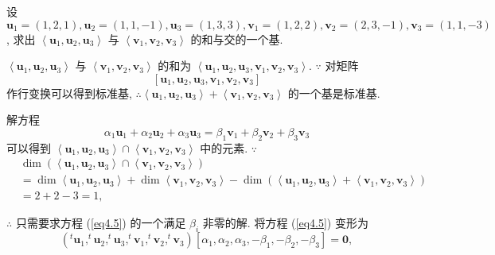 \documentclass[color=black,device=normal,lang=cn,mode=geye]{elegantnote}
\begin{document}
\begin{exercisec}[1.4.7(1)]
    设 $\boldsymbol{u}_1=(1,2,1),\boldsymbol{u}_2=(1,1,-1),\boldsymbol{u}_3=(1,3,3),\boldsymbol{v}_1=(1,2,2),\boldsymbol{v}_2=(2,3,-1),\boldsymbol{v}_3=(1,1,-3)$, 求出 $\left<\boldsymbol{u}_1,\boldsymbol{u}_2,\boldsymbol{u}_3\right>$ 与 $\left<\boldsymbol{v}_1,\boldsymbol{v}_2,\boldsymbol{v}_3\right>$ 的和与交的一个基.
\end{exercisec}
\begin{solution}
    $\left<\boldsymbol{u}_1,\boldsymbol{u}_2,\boldsymbol{u}_3\right>$ 与 $\left<\boldsymbol{v}_1,\boldsymbol{v}_2,\boldsymbol{v}_3\right>$ 的和为 $\left<\boldsymbol{u}_1,\boldsymbol{u}_2,\boldsymbol{u}_3,\boldsymbol{v}_1,\boldsymbol{v}_2,\boldsymbol{v}_3\right>$. $\because$ 对矩阵
    \[[\boldsymbol{u}_1,\boldsymbol{u}_2,\boldsymbol{u}_3,\boldsymbol{v}_1,\boldsymbol{v}_2,\boldsymbol{v}_3]\]
    作行变换可以得到标准基, $\therefore\left<\boldsymbol{u}_1,\boldsymbol{u}_2,\boldsymbol{u}_3\right>+\left<\boldsymbol{v}_1,\boldsymbol{v}_2,\boldsymbol{v}_3\right>$ 的一个基是标准基.

    解方程
    \begin{equation}\label{eq4.5}
        \alpha_1\boldsymbol{u}_1+\alpha_2\boldsymbol{u}_2+\alpha_3\boldsymbol{u}_3=\beta_1\boldsymbol{v}_1+\beta_2\boldsymbol{v}_2+\beta_3\boldsymbol{v}_3
    \end{equation}
    可以得到 $\left<\boldsymbol{u}_1,\boldsymbol{u}_2,\boldsymbol{u}_3\right>\cap\left<\boldsymbol{v}_1,\boldsymbol{v}_2,\boldsymbol{v}_3\right>$ 中的元素. $\because$
    \begin{align*}
        & \dim(\left<\boldsymbol{u}_1,\boldsymbol{u}_2,\boldsymbol{u}_3\right>\cap\left<\boldsymbol{v}_1,\boldsymbol{v}_2,\boldsymbol{v}_3\right>) \\
        & =\dim\left<\boldsymbol{u}_1,\boldsymbol{u}_2,\boldsymbol{u}_3\right>+\dim\left<\boldsymbol{v}_1,\boldsymbol{v}_2,\boldsymbol{v}_3\right>-\dim(\left<\boldsymbol{u}_1,\boldsymbol{u}_2,\boldsymbol{u}_3\right>+\left<\boldsymbol{v}_1,\boldsymbol{v}_2,\boldsymbol{v}_3\right>) \\
        & =2+2-3=1,
    \end{align*}

    $\therefore$ 只需要求方程 (\ref{eq4.5}) 的一个满足 $\beta_i$ 非零的解. 将方程 (\ref{eq4.5}) 变形为
    \[(^t\boldsymbol{u}_1,^t\boldsymbol{u}_2,^t\boldsymbol{u}_3,^t\boldsymbol{v}_1,^t\boldsymbol{v}_2,^t\boldsymbol{v}_3)[\alpha_1,\alpha_2,\alpha_3,-\beta_1,-\beta_2,-\beta_3]=\boldsymbol{0},\]
    

\end{solution}
\end{document}
